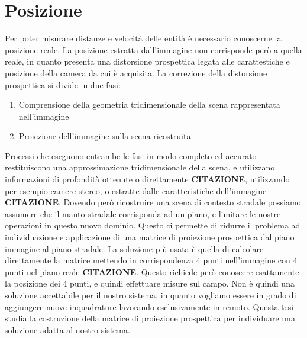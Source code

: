 \section{Posizione}
\label{sec:funzionalita-posizione}
Per poter misurare distanze e velocità delle entità è necessario conoscerne la posizione reale.
La posizione estratta dall'immagine non corrisponde però a quella reale, in quanto presenta una distorsione prospettica legata alle carattestiche e posizione della camera da cui è acquisita.
La correzione della distorsione prospettica si divide in due fasi:
\begin{enumerate}
    \item Comprensione della geometria tridimensionale della scena rappresentata nell'immagine
    \item Proiezione dell'immagine sulla scena ricostruita.
\end{enumerate}
Processi che eseguono entrambe le fasi in modo completo ed accurato restituiscono una approssimazione tridimensionale della scena, e utilizzano informazioni di profondità ottenute o direttamente \textbf{CITAZIONE}, utilizzando per esempio camere stereo, o estratte dalle caratteristiche dell'immagine \textbf{CITAZIONE}.
Dovendo però ricostruire una scena di contesto stradale possiamo assumere che il manto stradale corrisponda ad un piano, e limitare le nostre operazioni in questo nuovo dominio.
Questo ci permette di ridurre il problema ad individuazione e applicazione di una matrice di proiezione prospettica dal piano immagine al piano stradale.
La soluzione più usata è quella di calcolare direttamente la matrice mettendo in corrispondenza 4 punti nell'immagine con 4 punti nel piano reale \textbf{CITAZIONE}.
Questo richiede però conoscere esattamente la posizione dei 4 punti, e quindi effettuare misure sul campo.
Non è quindi una soluzione accettabile per il nostro sistema, in quanto vogliamo essere in grado di aggiungere nuove inquadrature lavorando esclusivamente in remoto.
Questa tesi studia la costruzione della matrice di proiezione prospettica per individuare una soluzione adatta al nostro sistema.

